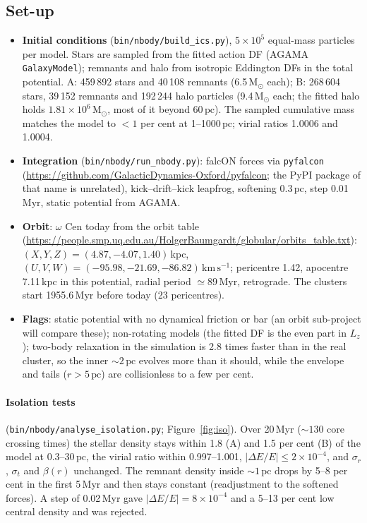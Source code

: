 \documentclass[11pt,a4paper]{article}
\newcommand{\Msun}{\ensuremath{\mathrm{M}_\odot}\xspace}
\newcommand{\pc}{\ensuremath{\,\mathrm{pc}}\xspace}
\newcommand{\kms}{\ensuremath{\,\mathrm{km\,s^{-1}}}\xspace}
\begin{document}
\subsection{Set-up}
\begin{itemize}
\item \textbf{Initial conditions} (\texttt{bin/nbody/build\_ics.py}),
  $5\times10^5$ equal-mass particles per model. Stars are sampled from the
  fitted action DF (AGAMA \texttt{GalaxyModel}); remnants and halo from
  isotropic Eddington DFs in the total potential. A: 459\,892 stars and
  40\,108 remnants (6.5\,\Msun each); B: 268\,604 stars, 39\,152 remnants
  and 192\,244 halo particles (9.4\,\Msun each; the fitted halo holds
  $1.81\times10^6\,\Msun$, most of it beyond 60\pc). The sampled cumulative
  mass matches the model to $<1$ per cent at 1--1000\pc; virial ratios
  1.0006 and 1.0004.
\item \textbf{Integration} (\texttt{bin/nbody/run\_nbody.py}): falcON
  forces via \texttt{pyfalcon} (\url{https://github.com/GalacticDynamics-Oxford/pyfalcon};
  the PyPI package of that name is unrelated), kick--drift--kick leapfrog,
  softening 0.3\pc, step 0.01\,Myr, static \citet{2017MNRAS.465...76M}
  potential from AGAMA.
\item \textbf{Orbit}: $\omega$ Cen today from the \citet{2021MNRAS.505.5957B}
  orbit table
  (\url{https://people.smp.uq.edu.au/HolgerBaumgardt/globular/orbits_table.txt}):
  $(X,Y,Z)=(4.87,-4.07,1.40)$\,kpc, $(U,V,W)=(-95.98,-21.69,-86.82)\kms$;
  pericentre 1.42, apocentre 7.11\,kpc in this potential, radial period
  $\simeq89$\,Myr, retrograde. The clusters start 1955.6\,Myr before today
  (23 pericentres).
\item \textbf{Flags}: static potential with no dynamical friction or bar
  (an orbit sub-project will compare these); non-rotating models (the
  fitted DF is the even part in $L_z$); two-body relaxation in the
  simulation is 2.8 times faster than in the real cluster, so the inner
  $\sim2\pc$ evolves more than it should, while the envelope and tails
  ($r>5\pc$) are collisionless to a few per cent.
\end{itemize}

\paragraph{Isolation tests} (\texttt{bin/nbody/analyse\_isolation.py};
Figure~\ref{fig:iso}). Over 20\,Myr ($\sim130$ core crossing times) the
stellar density stays within 1.8 (A) and 1.5 per cent (B) of the model at
0.3--30\pc, the virial ratio within 0.997--1.001, $|\Delta E/E|\le2\times10^{-4}$,
and $\sigma_r$, $\sigma_t$ and $\beta(r)$ unchanged. The remnant density
inside $\sim1\pc$ drops by 5--8 per cent in the first 5\,Myr and then stays
constant (readjustment to the softened forces). A step of 0.02\,Myr gave
$|\Delta E/E|=8\times10^{-4}$ and a 5--13 per cent low central density and
was rejected.
\end{document}
